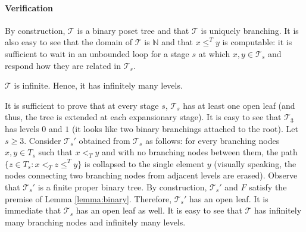\documentclass[a4paper,UKenglish,cleveref, autoref, thm-restate]{lipics-v2021}
\begin{document}
\paragraph*{Verification} By construction, $\mathcal T$ is a binary poset tree and that $\mathcal T$ is uniquely branching. It is also easy to see that the domain of $\mathcal T$ is $\mathbb N$ and that $x \leq^T y$ is computable: it is sufficient to wait in an unbounded loop for a stage $s$ at which $x,y \in \mathcal T_s$ and respond how they are related in $\mathcal T_s$. 

    
\begin{lemma}\label{lem:infinite}
$\mathcal T$ is infinite. Hence, it has infinitely many levels.
\end{lemma}
\begin{claimproof}
It is sufficient to prove that at every stage $s$, $\mathcal T_s$ has at least one open leaf (and thus, the tree is extended at each expansionary stage).
 It is easy to see that $\mathcal T_3$ has levels $0$ and $1$ (it looks like two binary branchings attached to the root). Let $s \geq 3$. Consider $\mathcal T_s'$ obtained from $\mathcal T_s$ as follows: for every branching nodes $x,y \in T_s$ such that $x <_T y$ and with no branching nodes between them, the path $\{ z \in T_s: x <_T z \leq^T y\}$ is collapsed to the single element $y$ (visually speaking, the nodes connecting two branching nodes from adjacent levels are erased). Observe that $\mathcal T_s'$ is a finite proper binary tree. By construction, $\mathcal T_s'$ and $F$ satisfy the premise of Lemma \ref{lemma:binary}. Therefore, $\mathcal T_s'$ has an open leaf. It is immediate that $\mathcal T_s$ has an open leaf as well. 
 It is easy to see that $\mathcal T$ has infinitely many branching nodes and infinitely many levels.
\end{claimproof}
\end{document}
